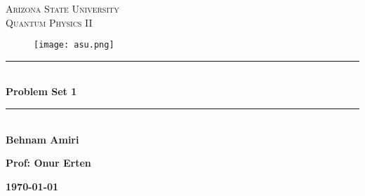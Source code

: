 \documentclass[fleqn]{article}
\begin{document}
  \begin{titlepage}

    \newcommand{\HRule}{\rule{\linewidth}{0.5mm}}

    \center


    \textsc{\LARGE Arizona State University}\\[1.5cm]

    \textsc{\LARGE Quantum Physics II}\\[1.5cm]


    \begin{figure}
      \texttt{[image: asu.png]}
    \end{figure}


    \HRule \\[0.4cm]
    { \huge \bfseries Problem Set 1}\\[0.4cm] 
    \HRule \\[1.5cm]

    \textbf{Behnam Amiri}

    \bigbreak

    \textbf{Prof: Onur Erten}

    \bigbreak


    \textbf{{\large \today}\\[2cm]}

    \vfill

  \end{titlepage}
\end{document}
